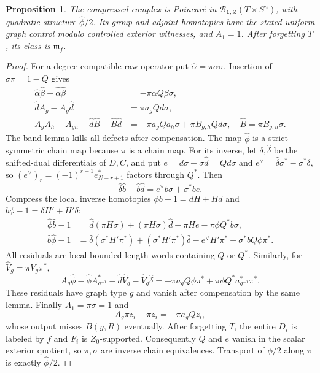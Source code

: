 \documentclass[11pt]{amsart}
\numberwithin{equation}{section}
\newtheorem{proposition}[proposition]{Proposition}
\theoremstyle{definition}
\theoremstyle{remark}
\begin{document}
\begin{proposition}\label{geo:compressed-realization}
The compressed complex is Poincar\'e in
$\mathcal B_{\mathbf1,Z}(T\times S^n)$, with quadratic structure
$\widehat\phi/2$. Its group and adjoint homotopies have the stated
uniform graph control modulo controlled exterior witnesses, and $A_1=1$.
After forgetting $T$, its class is $\mathfrak m_f$.
\end{proposition}
\begin{proof}
For a degree-compatible raw operator put $\widehat\alpha=\pi\alpha\sigma$.
Insertion of $\sigma\pi=1-Q$ gives
\begin{align}
 \widehat\alpha\widehat\beta-\widehat{\alpha\beta}
   &=-\pi\alpha Q\beta\sigma,\label{geo:compression-product}\\
 \widehat dA_g-A_g\widehat d
   &=\pi a_gQd\sigma,\label{geo:compression-chain}\\
 A_gA_h-A_{gh}-\widehat d\widehat B-\widehat B\widehat d
   &=-\pi a_gQa_h\sigma+\pi B_{g,h}Qd\sigma,
   \quad\widehat B=\pi B_{g,h}\sigma.
   \label{geo:compression-relation}
\end{align}
The band lemma kills all defects after compensation. The map
$\widehat\phi$ is a strict symmetric chain map because $\pi$ is a chain
map. For its inverse, let $\delta,\widehat\delta$ be the shifted-dual
differentials of $D,C$, and put
$e=d\sigma-\sigma\widehat d=Qd\sigma$ and
$e^\vee=\widehat\delta\sigma^*-\sigma^*\delta$, so
$(e^\vee)_r=(-1)^{r+1}e_{N-r+1}^*$ factors through $Q^*$.
Then
\[
 \widehat\delta\widehat b-\widehat b\widehat d
 =e^\vee b\sigma+\sigma^*be.
\]
Compress the local inverse homotopies
$\phi b-1=dH+Hd$ and $b\phi-1=\delta H'+H'\delta$:
\begin{align*}
 \widehat\phi\widehat b-1
 &=\widehat d(\pi H\sigma)+(\pi H\sigma)\widehat d
      +\pi He-\pi\phi Q^*b\sigma,\\
 \widehat b\widehat\phi-1
 &=\widehat\delta(\sigma^*H'\pi^*)
      +(\sigma^*H'\pi^*)\widehat\delta
      -e^\vee H'\pi^*-\sigma^*bQ\phi\pi^*.
\end{align*}
All residuals are local bounded-length words containing $Q$ or $Q^*$.
Similarly, for $\widehat V_g=\pi V_g\pi^*$,
\[
 A_g\widehat\phi-\widehat\phi A_{g^{-1}}^*
 -\widehat d\widehat V_g-\widehat V_g\widehat\delta
 =-\pi a_gQ\phi\pi^*
       +\pi\phi Q^*a_{g^{-1}}^*\pi^*.
\]
These residuals have graph type $g$ and vanish after compensation by
the same lemma. Finally $A_1=\pi\sigma=1$ and
\begin{equation}\label{geo:compressed-orientation}
 A_g\pi z_i-\pi z_i=-\pi a_gQz_i,
\end{equation}
whose output misses $\overline{B(y,R)}$ eventually.
After forgetting $T$, the entire $D_i$ is labeled by $f$ and $F_i$ is
$Z_0$-supported. Consequently $Q$ and $e$ vanish in the scalar exterior
quotient, so $\pi,\sigma$ are inverse chain equivalences. Transport of
$\phi/2$ along $\pi$ is exactly $\widehat\phi/2$.
\end{proof}
\end{document}
